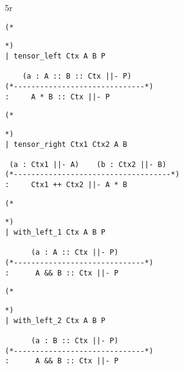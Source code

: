5r\documentclass{article}
\theoremstyle{definition}
\begin{document}
\noindent\begin{minipage}{\textwidth}
\begin{verbatim}
(*
\end{verbatim}
\begin{center}\usebox{\tensorL}\end{center}
\begin{verbatim}
*)
| tensor_left Ctx A B P

    (a : A :: B :: Ctx ||- P)
(*------------------------------*)
:     A * B :: Ctx ||- P
\end{verbatim}
\end{minipage}

\noindent\begin{minipage}{\textwidth}
\begin{verbatim}
(*
\end{verbatim}
\begin{center}\usebox{\tensorR}\end{center}
\begin{verbatim}
*)
| tensor_right Ctx1 Ctx2 A B

 (a : Ctx1 ||- A)    (b : Ctx2 ||- B)
(*------------------------------------*)
:     Ctx1 ++ Ctx2 ||- A * B

\end{verbatim}
\end{minipage}

\noindent\begin{minipage}{\textwidth}
\begin{verbatim}
(*
\end{verbatim}
\begin{center}\usebox{\withLA}\end{center}
\begin{verbatim}
*)
| with_left_1 Ctx A B P

      (a : A :: Ctx ||- P)
(*------------------------------*) 
:      A && B :: Ctx ||- P 

\end{verbatim}
\end{minipage}

\noindent\begin{minipage}{\textwidth}
\begin{verbatim}
(*
\end{verbatim}
\begin{center}\usebox{\withLB}\end{center}
\begin{verbatim}
*)
| with_left_2 Ctx A B P

      (a : B :: Ctx ||- P)
(*------------------------------*) 
:      A && B :: Ctx ||- P 


\end{verbatim}
\end{minipage}
\end{document}

